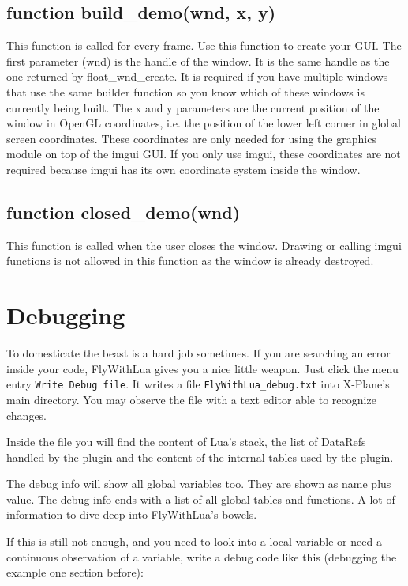 \documentclass[11pt,parskip=half,a4paper]{scrartcl}
\begin{document}
\subsection{function build\_demo(wnd, x, y)}

This function is called for every frame. Use this function to create your GUI. The first parameter (wnd)
is the handle of the window. It is the same handle as the one returned by float\_wnd\_create. It is required if you have multiple windows that use the same builder function so you know which of these windows is currently being built. The x and y parameters are the current position of the window in OpenGL coordinates, i.e. the position of the lower left corner in global screen coordinates. These coordinates are only needed for using the graphics module on top of the imgui GUI. If you only use imgui, these coordinates are not required because imgui has its own coordinate system inside the window.

\subsection{function closed\_demo(wnd)}

This function is called when the user closes the window. Drawing or calling imgui functions is not allowed in this function as the window is already destroyed.


\newpage
\section{Debugging}

To domesticate the beast is a hard job sometimes. If you are searching an error inside your code, FlyWithLua gives you a nice little weapon. Just click the menu entry \verb|Write Debug file|. It writes a file \verb|FlyWithLua_debug.txt| into X-Plane's main directory. You may observe the file with a text editor able to recognize changes.

Inside the file you will find the content of Lua's stack, the list of DataRefs handled by the plugin and the content of the internal tables used by the plugin.

The debug info will show all global variables too. They are shown as name plus value. The debug info ends with a list of all global tables and functions. A lot of information to dive deep into FlyWithLua's bowels.

If this is still not enough, and you need to look into a local variable or need a continuous observation of a variable, write a debug code like this (debugging the example one section before):
\end{document}
